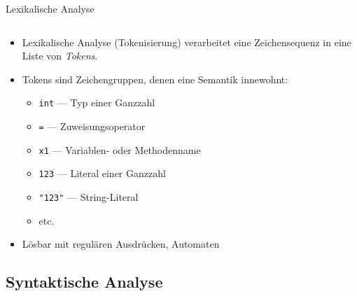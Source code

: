 \documentclass{beamer}
\begin{document}
\begin{frame}{Lexikalische Analyse}
	\begin{columns}
		\begin{column}{0.5\textwidth}
		\end{column}
		\begin{column}{0.5\textwidth}
		\end{column}
	\end{columns}

	\begin{itemize}
		\item Lexikalische Analyse (Tokenisierung) verarbeitet eine Zeichensequenz in eine Liste von \emph{Tokens}.
		\item Tokens sind Zeichengruppen, denen eine Semantik innewohnt:
		\begin{itemize}
			\item \texttt{int} --- Typ einer Ganzzahl
			\item \texttt{=} --- Zuweisungsoperator
			\item \texttt{x1} --- Variablen- oder Methodenname
			\item \texttt{123} --- Literal einer Ganzzahl
			\item \texttt{"123"} --- String-Literal
			\item etc.
		\end{itemize}
		\item Lösbar mit regulären Ausdrücken, Automaten
	\end{itemize}
\end{frame}

\subsection{Syntaktische Analyse}
\end{document}

